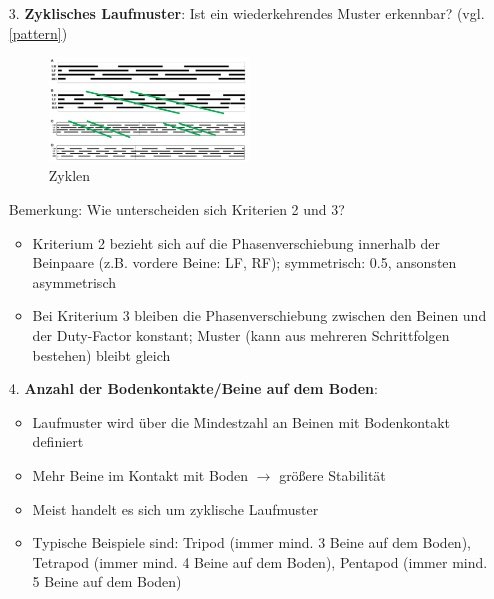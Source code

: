 \begin{itemize}
\item[3.] \textbf{Zyklisches Laufmuster}: Ist ein wiederkehrendes Muster erkennbar? (vgl. \autoref{pattern})
\begin{figure}[h!]
	\centering
	\includegraphics[width=0.5\textwidth]{figures/ch06_pattern.png}
	\caption{Zyklen}
	\label{pattern}
\end{figure}
\item[] Bemerkung: Wie unterscheiden sich Kriterien 2 und 3?
\begin{itemize}
\item Kriterium 2 bezieht sich auf die Phasenverschiebung innerhalb der Beinpaare (z.B. vordere Beine: LF, RF);  symmetrisch: 0.5, ansonsten asymmetrisch
\item Bei Kriterium 3 bleiben die Phasenverschiebung zwischen den Beinen und der Duty-Factor konstant; Muster (kann aus mehreren Schrittfolgen bestehen) bleibt gleich
\end{itemize}
\item[4.] \textbf{Anzahl der Bodenkontakte/Beine auf dem Boden}:
\begin{itemize}
\item Laufmuster wird über die Mindestzahl an Beinen mit Bodenkontakt definiert
\item Mehr Beine im Kontakt mit Boden $\rightarrow$ größere Stabilität
\item Meist handelt es sich um zyklische Laufmuster
\item Typische Beispiele sind: Tripod (immer mind. 3 Beine auf dem Boden), Tetrapod (immer mind. 4 Beine auf dem Boden), Pentapod (immer mind. 5 Beine auf dem Boden)
\end{itemize}
\end{itemize}
